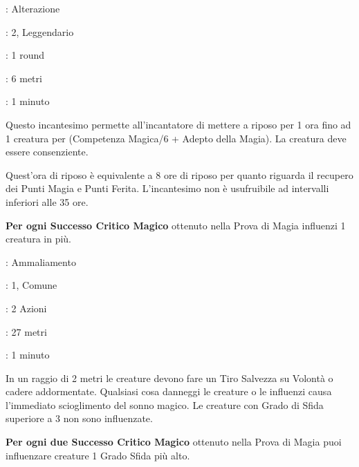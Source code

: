 \begin{multicols}{2}
\noindent\colorbox{OBSSgold!10}{
\begin{minipage}{0.95\linewidth}
\begin{description}[noitemsep, topsep=0pt, parsep=0pt, partopsep=0pt, leftmargin=0cm, labelwidth=1.3cm]
	\item[\textbf{Lista}]: Alterazione
	\item[\textbf{Livello}]: 2, Leggendario
	\item[\textbf{Lancio}]: 1 round
	\item[\textbf{Gittata}]: 6 metri
	\item[\textbf{Durata}]: 1 minuto
\end{description}
\end{minipage}}\smallskip

Questo incantesimo permette all'incantatore di mettere a riposo per 1 ora fino ad 1 creatura per (Competenza Magica/6 + Adepto della Magia). La creatura deve essere consenziente.

Quest'ora di riposo è equivalente a 8 ore di riposo per quanto riguarda il recupero dei Punti Magia e Punti Ferita. L'incantesimo non è usufruibile ad intervalli inferiori alle 35 ore.

\textbf{Per ogni Successo Critico Magico} ottenuto nella Prova di Magia influenzi 1 creatura in più.

\noindent\colorbox{OBSSgold!10}{
\begin{minipage}{0.95\linewidth}
\begin{description}[noitemsep, topsep=0pt, parsep=0pt, partopsep=0pt, leftmargin=0cm, labelwidth=1.3cm]
	\item[\textbf{Lista}]: Ammaliamento
	\item[\textbf{Livello}]: 1, Comune
	\item[\textbf{Lancio}]: 2 Azioni
	\item[\textbf{Gittata}]: 27 metri
	\item[\textbf{Durata}]: 1 minuto
\end{description}
\end{minipage}}\smallskip

In un raggio di 2 metri le creature devono fare un Tiro Salvezza su Volontà o cadere addormentate. Qualsiasi cosa danneggi le creature o le influenzi causa l'immediato scioglimento del sonno magico. Le creature con Grado di Sfida superiore a 3 non sono influenzate.

\textbf{Per ogni due Successo Critico Magico} ottenuto nella Prova di Magia puoi influenzare creature 1 Grado Sfida più alto.


\end{multicols}
